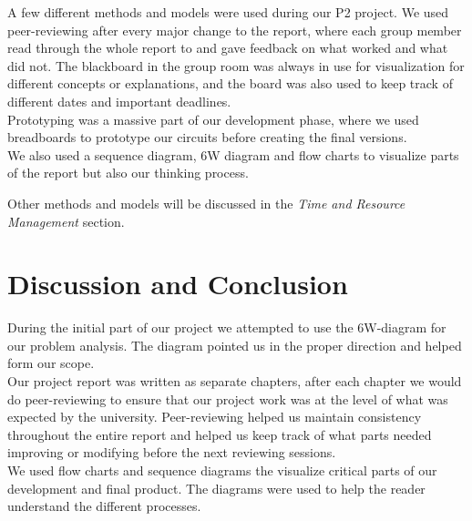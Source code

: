 A few different methods and models were used during our P2 project. We used peer-reviewing after every major change to the report, where each group member read through the whole report to and gave feedback on what worked and what did not. The blackboard in the group room was always in use for visualization for different concepts or explanations, and the board was also used to keep track of different dates and important deadlines.\\
Prototyping was a massive part of our development phase, where we used breadboards to prototype our circuits before creating the final versions.\\
We also used a sequence diagram, 6W diagram and flow charts to visualize parts of the report but also our thinking process.

Other methods and models will be discussed in the \textit{Time and Resource Management} section. 
\section{Discussion and Conclusion}

During the initial part of our project we attempted to use the 6W-diagram for our problem analysis. The diagram pointed us in the proper direction and helped form our scope.\\
Our project report was written as separate chapters, after each chapter we would do peer-reviewing to ensure that our project work was at the level of what was expected by the university. Peer-reviewing helped us maintain consistency throughout the entire report and helped us keep track of what parts needed improving or modifying before the next reviewing sessions.\\
We used flow charts and sequence diagrams the visualize critical parts of our development and final product. The diagrams were used to help the reader understand the different processes. 
